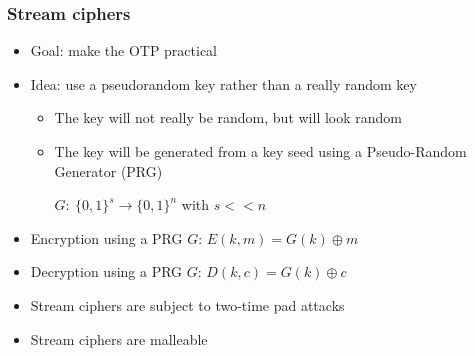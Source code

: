 \documentclass[aspectratio=169, lualatex, handout, 10pt,dvipsnames,svgnames]{beamer} %
\def\enrouge#1{\textcolor{rouge}{#1}}
\begin{document}
\author{}
\date{}

\begin{frame}
  \titlepage
\end{frame}

\begin{frame}
  \frametitle{Stream ciphers}

  \begin{itemize}
  \item Goal: make the OTP practical
    \medskip{}
    \pause
  \item Idea: use a pseudorandom key rather than a really random key
    \pause
    \begin{itemize}
    \item The key will not really be random, but will look random
      \pause
    \item The key will be generated from a key seed using a Pseudo-Random Generator (PRG)

      $G:\ \{0, 1\}^s \rightarrow \{0, 1\}^n$ with $s<<n$
    \end{itemize}
    \medskip{}
    \pause
  \item Encryption using a PRG $G$: $E(k, m) = G(k) \oplus m$
    \medskip{}
    \pause
  \item Decryption using a PRG $G$: $D(k, c) = G(k) \oplus c$
    \medskip{}
    \pause{}

  \item \enrouge{Stream ciphers are subject to two-time pad attacks}
    \medskip{}
    \pause{}

  \item \enrouge{Stream ciphers are malleable}
  \end{itemize}
 
\end{frame}
\end{document}
